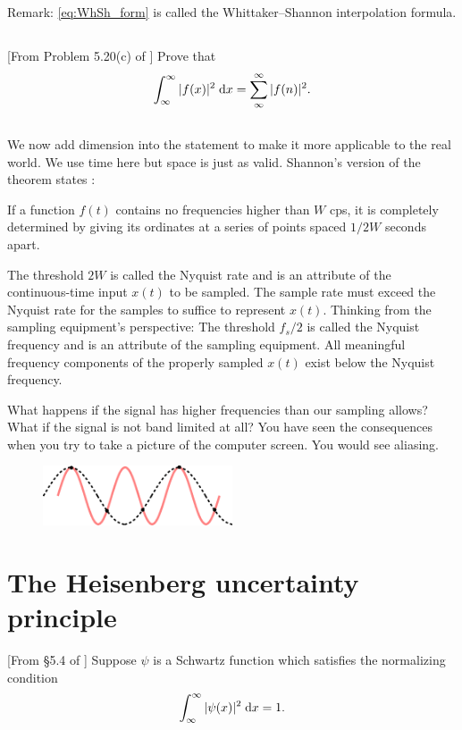 \documentclass[11pt,letterpaper]{article}
\begin{document}
Remark: \eqref{eq:WhSh_form} is called the Whittaker–Shannon interpolation formula.

\subsection{}
[From Problem 5.20(c) of \cite{SteinShakarchi_03}] Prove that
\begin{align}
    \int_\infty ^\infty |f(x)|^2\;\mathrm{d} x = \sum_\infty ^\infty |f(n)|^2.
\end{align}

\subsection{}
We now add dimension into the statement to make it more applicable to the real world. We use time here but space is just as valid. Shannon's version of the theorem states \parencite{Shannon_49}:
\begin{displayquote}
    If a function $f(t)$ contains no frequencies higher than $W$ cps, it is completely determined by giving its ordinates at a series of points spaced $1/2W$ seconds apart.
\end{displayquote}
The threshold $2W$ is called the Nyquist rate and is an attribute of the continuous-time input $x(t)$ to be sampled. The sample rate must exceed the Nyquist rate for the samples to suffice to represent $x(t)$. Thinking from the sampling equipment's perspective: The threshold $f_{s}/2$ is called the Nyquist frequency and is an attribute of the sampling equipment. All meaningful frequency components of the properly sampled $x(t)$ exist below the Nyquist frequency. 

What happens if the signal has higher frequencies than our sampling allows? What if the signal is not band limited at all? You have seen the consequences when you try to take a picture of the computer screen. You would see aliasing.
\begin{figure}[H]
    \centering
    \includegraphics[width = 0.5\textwidth]{figs/alias}
\end{figure}

\section{The Heisenberg uncertainty principle}
[From \S5.4 of \cite{SteinShakarchi_03}] Suppose $\psi$ is a Schwartz function which satisfies the normalizing condition
\begin{align}
    \int_\infty^\infty |\psi(x)|^2 \;\mathrm{d} x = 1.\label{eq:normaliz}
\end{align}
\end{document}
